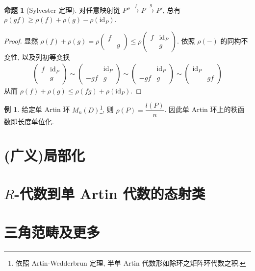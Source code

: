 \documentclass{MainStyle}
\theoremstyle{definition}
\newtheorem{example}{例}
\theoremstyle{definition}
\theoremstyle{definition}
\theoremstyle{definition}
\newtheorem{proposition}{命题}
\theoremstyle{definition}
\theoremstyle{definition}
\theoremstyle{definition}
\theoremstyle{remark}
\theoremstyle{remark}
\begin{document}
\begin{proposition}[Sylvester 定理]
    对任意映射链 $P''\overset f\to P\overset g\to P'$, 总有 $\rho(gf)\geq \rho(f)+\rho(g)-\rho(\mathrm{id}_P)$.
    \begin{proof}
        显然 $\rho(f)+\rho(g)=\rho\begin{pmatrix}
                f & \\&g
            \end{pmatrix}\leq \rho \begin{pmatrix}
                f & \mathrm{id}_P \\&g
            \end{pmatrix}$. 依照 $\rho(-)$ 的同构不变性, 以及列初等变换
        \begin{align*}
            \begin{pmatrix}
                f & \mathrm{id}_P \\&g
            \end{pmatrix}
            \sim
            \begin{pmatrix}
                 & \mathrm{id}_P \\-gf&g
            \end{pmatrix}
            \sim
            \begin{pmatrix}
                 & \mathrm{id}_P \\-gf&g
            \end{pmatrix}
            \sim
            \begin{pmatrix}
                \mathrm{id}_P \\&gf
            \end{pmatrix}
        \end{align*}
        从而 $\rho(f)+\rho(g)\leq \rho(fg)+\rho(\mathrm{id}_P)$.
    \end{proof}
\end{proposition}

\begin{example}
    给定单 Artin 环 $M_n(D)$\footnote{依照 Artin-Wedderbrun 定理, 半单 Artin 代数形如除环之矩阵环代数之积.}, 则 $\rho(P)=\dfrac{l(P)}n$. 因此单 Artin 环上的秩函数即长度单位化.
\end{example}

\section{(广义)局部化}

\section{$R$-代数到单 Artin 代数的态射类}

\section{三角范畴及更多}
\end{document}
